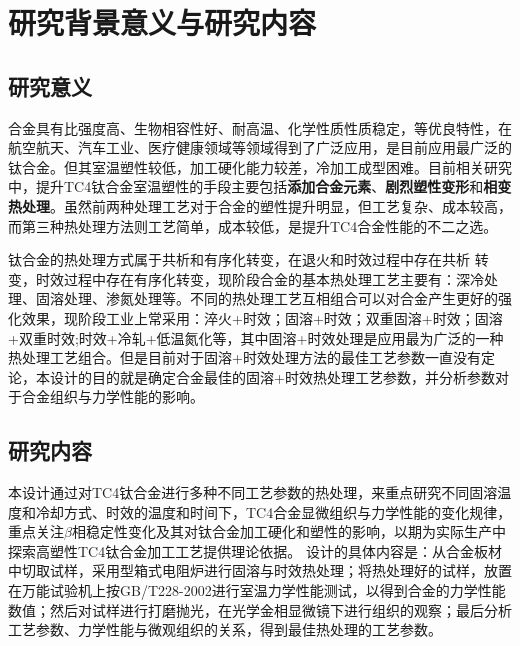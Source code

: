\section{研究背景意义与研究内容}
\subsection{研究意义}
\ti 合金具有比强度高、生物相容性好、耐高温、化学性质性质稳定，等优良特性，在航空航天、汽车工业、医疗健康领域等领域得到了广泛应用，是目前应用最广泛的钛合金。但其室温塑性较低，加工硬化能力较差，冷加工成型困难。目前相关研究中，提升TC4钛合金室温塑性的手段主要包括\textbf{添加合金元素}、\textbf{剧烈塑性变形}和\textbf{相变热处理}。虽然前两种处理工艺对于合金的塑性提升明显，但工艺复杂、成本较高\cite{miao}，而第三种热处理方法则工艺简单，成本较低，是提升TC4合金性能的不二之选。

钛合金的热处理方式属于共析和有序化转变，在退火和时效过程中存在共析 转变，时效过程中存在有序化转变，现阶段\ti 合金的基本热处理工艺主要有：深冷处理、固溶处理、渗氮处理等。不同的热处理工艺互相组合可以对合金产生更好的强化效果，现阶段工业上常采用\cite{zhoukaixiangJiyushenlengchulidenanjiagongcailiaoqiexiaotexingyanjiu2022}：淬火+时效；固溶+时效；双重固溶+时效；固溶+双重时效;时效+冷轧+低温氮化等，其中固溶+时效处理是应用最为广泛的一种热处理工艺组合。但是目前对于固溶+时效处理方法的最佳工艺参数一直没有定论，本设计的目的就是确定\ti 合金最佳的固溶+时效热处理工艺参数，并分析参数对于合金组织与力学性能的影响。

\subsection{研究内容}
本设计通过对TC4钛合金进行多种不同工艺参数的热处理，来重点研究不同固溶温度和冷却方式、时效的温度和时间下，TC4合金显微组织与力学性能的变化规律，重点关注$ \beta  $相稳定性变化及其对钛合金加工硬化和塑性的影响，以期为实际生产中探索高塑性TC4钛合金加工工艺提供理论依据。
设计的具体内容是：从\ti 合金板材中切取试样，采用型箱式电阻炉进行固溶与时效热处理；将热处理好的试样，放置在万能试验机上按{GB/T228-2002}进行室温力学性能测试，以得到合金的力学性能数值；然后对试样进行打磨抛光，在光学金相显微镜下进行组织的观察；最后分析工艺参数、力学性能与微观组织的关系，得到最佳热处理的工艺参数。
